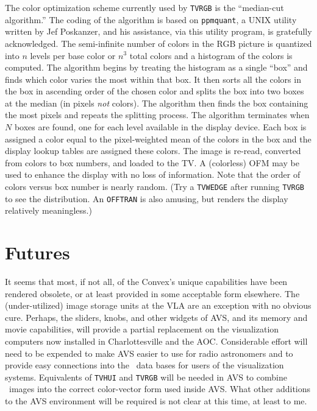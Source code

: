 The color optimization scheme currently used by {\tt TVRGB} is the
``median-cut algorithm.''  The coding of the algorithm is based on
{\tt ppmquant}, a UNIX utility written by Jef Poskanzer, and his
assistance, via this utility program, is gratefully acknowledged.  The
semi-infinite number of colors in the RGB picture is quantized into
$n$ levels per base color or $n^3$ total colors and a histogram of the
colors is computed.  The algorithm begins by treating the histogram as
a single ``box'' and finds which color varies the most within that
box.  It then sorts all the colors in the box in ascending order of
the chosen color and splits the box into two boxes at the median (in
pixels {\em not} colors).  The algorithm then finds the box containing
the most pixels and repeats the splitting process.  The algorithm
terminates when $N$ boxes are found, one for each level available in
the display device.  Each box is assigned a color equal to the
pixel-weighted mean of the colors in the box and the display lookup
tables are assigned these colors.  The image is re-read, converted
from colors to box numbers, and loaded to the \hbox{TV}.  A
(colorless) OFM may be used to enhance the display with no loss of
information.  Note that the order of colors versus box number is
nearly random.  (Try a {\tt TVWEDGE} after running {\tt TVRGB} to see
the distribution.  An {\tt OFFTRAN} is also amusing, but renders the
display relatively meaningless.)

\section{Futures}

It seems that most, if not all, of the Convex's unique capabilities
have been rendered obsolete, or at least provided in some acceptable
form elsewhere.  The (under-utilized) image storage units at the VLA
are an exception with no obvious cure.  Perhaps, the sliders, knobs,
and other widgets of AVS, and its memory and movie capabilities, will
provide a partial replacement on the visualization computers now
installed in Charlottesville and the \hbox{AOC}.  Considerable effort
will need to be expended to make AVS easier to use for radio
astronomers and to provide easy connections into the \AIPS\ data bases
for users of the visualization systems.  Equivalents of {\tt TVHUI}
and {\tt TVRGB} will be needed in AVS to combine \AIPS\ images into
the correct color-vector form used inside \hbox{AVS}.  What other
additions to the AVS environment will be required is not clear at this
time, at least to me.

